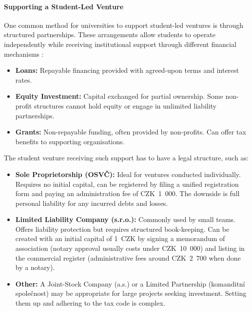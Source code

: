 \paragraph{Supporting a Student-Led Venture}\label{subsec:supporting-student-venture}
One common method for universities to support student-led ventures is through structured partnerships. These arrangements allow students to operate independently while receiving institutional support through different financial mechanisms \cite{fundinvoice-funding}:
\begin{itemize}
    \item \textbf{Loans:} Repayable financing provided with agreed-upon terms and interest rates.
    \item \textbf{Equity Investment:} Capital exchanged for partial ownership. Some non-profit structures cannot hold equity or engage in unlimited liability partnerships.
    \item \textbf{Grants:} Non-repayable funding, often provided by non-profits. Can offer tax benefits to supporting organisations.
\end{itemize}
The student venture receiving such support has to have a legal structure, such as:
\begin{itemize}
    \item \textbf{Sole Proprietorship (OSVČ):} Ideal for ventures conducted individually. Requires no initial capital, can be registered by filing a unified registration form and paying an administration fee of CZK~1~000. The downside is full personal liability for any incurred debts and losses. \cite{fakturoid-osvc, Zapletalova-osvc, lano-payroll, mpsv-social-sec}
    \item \textbf{Limited Liability Company (s.r.o.):} Commonly used by small teams. Offers liability protection but requires structured book-keeping. Can be created with an initial capital of 1~CZK by signing a memorandum of association (notary approval usually costs under CZK~10~000) and listing in the commercial register (administrative fees around CZK~2~700 when done by a notary). \cite{vajda-llc, lano-payroll, mpsv-social-sec}
    \item \textbf{Other:} A Joint-Stock Company (a.s.) or a Limited Partnership (komanditní společnost) may be appropriate for large projects seeking investment. Setting them up and adhering to the tax code is complex.\cite{ke-obchodni-spolecnosti}
\end{itemize}

